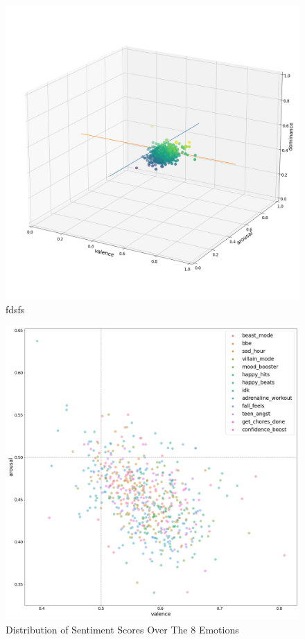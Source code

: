 \documentclass[11pt]{article}
\begin{document}
\begin{figure}[!ht]
  \includegraphics[scale=0.3]{../statics/plots/vad.png}
  \centering
  \caption{fdsfs}
  \label{fig:vad_points}
\end{figure}

\begin{figure}[!ht]
  \includegraphics[scale=0.3]{../statics/plots/va_playlist_False.png}
  \centering
  \caption{Distribution of Sentiment Scores Over The 8 Emotions}
  \label{fig:va_points}
\end{figure}
\end{document}
